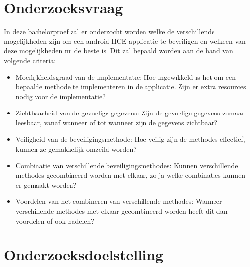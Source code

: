 \section{Onderzoeksvraag}
\label{sec:onderzoeksvraag}


In deze bachelorproef zal er onderzocht worden welke de verschillende mogelijkheden zijn om een android HCE applicatie te beveiligen en welkeen van deze mogelijkheden nu de beste is. Dit zal bepaald worden aan de hand van volgende criteria:

\begin{itemize}
	\item Moeilijkheidsgraad van de implementatie: Hoe ingewikkeld is het om een bepaalde methode te implementeren in de applicatie. Zijn er extra resources nodig voor de implementatie?
	\item Zichtbaarheid van de gevoelige gegevens: Zijn de gevoelige gegevens zomaar leesbaar, vanaf wanneer of tot wanneer zijn de gegevens zichtbaar?
	\item Veiligheid van de beveiligingsmethode: Hoe veilig zijn de methodes effectief, kunnen ze gemakkelijk omzeild worden?
	\item Combinatie van verschillende beveiligingsmethodes: Kunnen verschillende methodes gecombineerd worden met elkaar, zo ja welke combinaties kunnen er gemaakt worden? 
	\item Voordelen van het combineren van verschillende methodes: Wanneer verschillende methodes met elkaar gecombineerd worden heeft dit dan voordelen of ook nadelen? 
\end{itemize}



\section{Onderzoeksdoelstelling}
\label{sec:onderzoeksdoelstelling}


